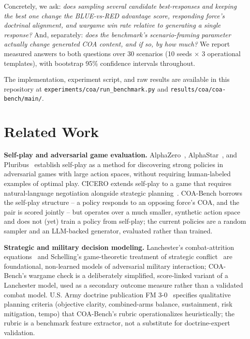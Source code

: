 \documentclass[sigconf]{acmart}
\begin{document}
Concretely, we ask: \emph{does sampling several candidate best-responses and keeping the best one change the BLUE-vs-RED advantage score, responding force's doctrinal alignment, and wargame win rate relative to generating a single response?} And, separately: \emph{does the benchmark's scenario-framing parameter actually change generated COA content, and if so, by how much?} We report measured answers to both questions over 30 scenarios (10 seeds $\times$ 3 operational templates), with bootstrap 95\% confidence intervals throughout.

The implementation, experiment script, and raw results are available in this repository at \texttt{experiments/coa/run\_benchmark.py} and \texttt{results/coa/coa-bench/main/}.

\section{Related Work}

\textbf{Self-play and adversarial game evaluation.} AlphaZero~\cite{silver2018alphazero}, AlphaStar~\cite{vinyals2019alphastar}, and Pluribus~\cite{brown2019superhuman} establish self-play as a method for discovering strong policies in adversarial games with large action spaces, without requiring human-labeled examples of optimal play. CICERO extends self-play to a game that requires natural-language negotiation alongside strategic planning~\cite{bakhtin2022cicero}. COA-Bench borrows the self-play structure -- a policy responds to an opposing force's COA, and the pair is scored jointly -- but operates over a much smaller, synthetic action space and does not (yet) train a policy from self-play; the current policies are a random sampler and an LLM-backed generator, evaluated rather than trained.

\textbf{Strategic and military decision modeling.} Lanchester's combat-attrition equations~\cite{lanchester1916} and Schelling's game-theoretic treatment of strategic conflict~\cite{schelling1960} are foundational, non-learned models of adversarial military interaction; COA-Bench's wargame check is a deliberately simplified, score-linked variant of a Lanchester model, used as a secondary outcome measure rather than a validated combat model. U.S. Army doctrine publication FM 3-0~\cite{fm30} specifies qualitative planning criteria (objective clarity, combined-arms balance, sustainment, risk mitigation, tempo) that COA-Bench's rubric operationalizes heuristically; the rubric is a benchmark feature extractor, not a substitute for doctrine-expert validation.
\end{document}
